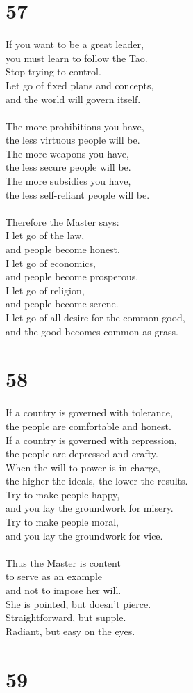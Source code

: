 \documentclass[b5paper, 12pt, oneside]{book}
\begin{document}
\chapter*{57}
If you want to be a great leader,\\
you must learn to follow the Tao.\\
Stop trying to control.\\
Let go of fixed plans and concepts,\\
and the world will govern itself.\\
\\
The more prohibitions you have,\\
the less virtuous people will be.\\
The more weapons you have,\\
the less secure people will be.\\
The more subsidies you have,\\
the less self-reliant people will be.\\
\\
Therefore the Master says:\\
I let go of the law,\\
and people become honest.\\
I let go of economics,\\
and people become prosperous.\\
I let go of religion,\\
and people become serene.\\
I let go of all desire for the common good,\\
and the good becomes common as grass.

\chapter*{58}
If a country is governed with tolerance,\\
the people are comfortable and honest.\\
If a country is governed with repression,\\
the people are depressed and crafty.
\\
When the will to power is in charge,\\
the higher the ideals, the lower the results.\\
Try to make people happy,\\
and you lay the groundwork for misery.\\
Try to make people moral,\\
and you lay the groundwork for vice.\\
\\
Thus the Master is content\\
to serve as an example\\
and not to impose her will.\\
She is pointed, but doesn't pierce.\\
Straightforward, but supple.\\
Radiant, but easy on the eyes.

\chapter*{59}
\end{document}
